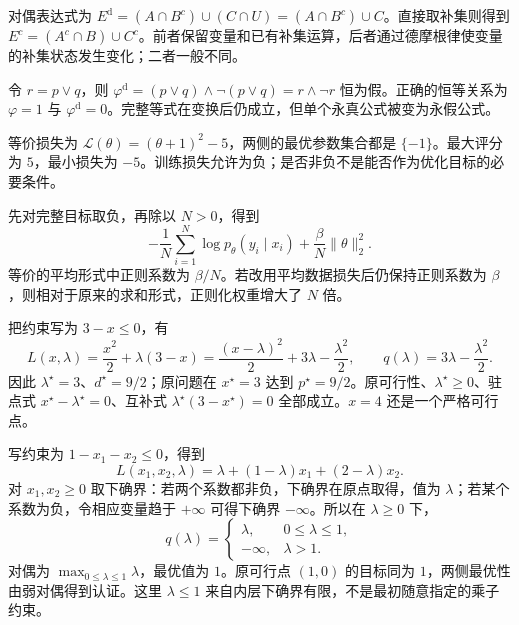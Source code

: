 \documentclass[UTF8,12pt,a4paper,fontset=fandol]{ctexart}
\begin{document}
\begin{solve}
对偶表达式为 $E^{\mathrm d}=(A\cap B^c)\cup(C\cap U)= (A\cap B^c)\cup C$。直接取补集则得到 $E^c=(A^c\cap B)\cup C^c$。前者保留变量和已有补集运算，后者通过德摩根律使变量的补集状态发生变化；二者一般不同。
\end{solve}

\begin{solve}
令 $r=p\lor q$，则 $\varphi^{\mathrm d}=(p\lor q)\land\neg(p\lor q)=r\land\neg r$ 恒为假。正确的恒等关系为 $\varphi=1$ 与 $\varphi^{\mathrm d}=0$。完整等式在变换后仍成立，但单个永真公式被变为永假公式。
\end{solve}

\begin{solve}
等价损失为 $\mathcal L(\theta)=(\theta+1)^2-5$，两侧的最优参数集合都是 $\{-1\}$。最大评分为 $5$，最小损失为 $-5$。训练损失允许为负；是否非负不是能否作为优化目标的必要条件。
\end{solve}

\begin{solve}
先对完整目标取负，再除以 $N>0$，得到
\[
 -\frac1N\sum_{i=1}^N\log p_\theta(y_i\mid x_i)
 +\frac\beta N\|\theta\|_2^2.
\]
等价的平均形式中正则系数为 $\beta/N$。若改用平均数据损失后仍保持正则系数为 $\beta$，则相对于原来的求和形式，正则化权重增大了 $N$ 倍。
\end{solve}

\begin{solve}
把约束写为 $3-x\leq0$，有
\[
 L(x,\lambda)=\frac{x^2}{2}+\lambda(3-x)
 =\frac{(x-\lambda)^2}{2}+3\lambda-\frac{\lambda^2}{2},
 \qquad q(\lambda)=3\lambda-\frac{\lambda^2}{2}.
\]
因此 $\lambda^\star=3$、$d^\star=9/2$；原问题在 $x^\star=3$ 达到 $p^\star=9/2$。原可行性、$\lambda^\star\geq0$、驻点式 $x^\star-\lambda^\star=0$、互补式 $\lambda^\star(3-x^\star)=0$ 全部成立。$x=4$ 还是一个严格可行点。
\end{solve}

\begin{solve}
写约束为 $1-x_1-x_2\leq0$，得到
\[
 L(x_1,x_2,\lambda)
 =\lambda+(1-\lambda)x_1+(2-\lambda)x_2.
\]
对 $x_1,x_2\geq0$ 取下确界：若两个系数都非负，下确界在原点取得，值为 $\lambda$；若某个系数为负，令相应变量趋于 $+\infty$ 可得下确界 $-\infty$。所以在 $\lambda\geq0$ 下，
\[
 q(\lambda)=
 \begin{cases}
 \lambda,&0\leq\lambda\leq1,\\
 -\infty,&\lambda>1.
 \end{cases}
\]
对偶为 $\max_{0\leq\lambda\leq1}\lambda$，最优值为 $1$。原可行点 $(1,0)$ 的目标同为 $1$，两侧最优性由弱对偶得到认证。这里 $\lambda\leq1$ 来自内层下确界有限，不是最初随意指定的乘子约束。
\end{solve}
\end{document}
